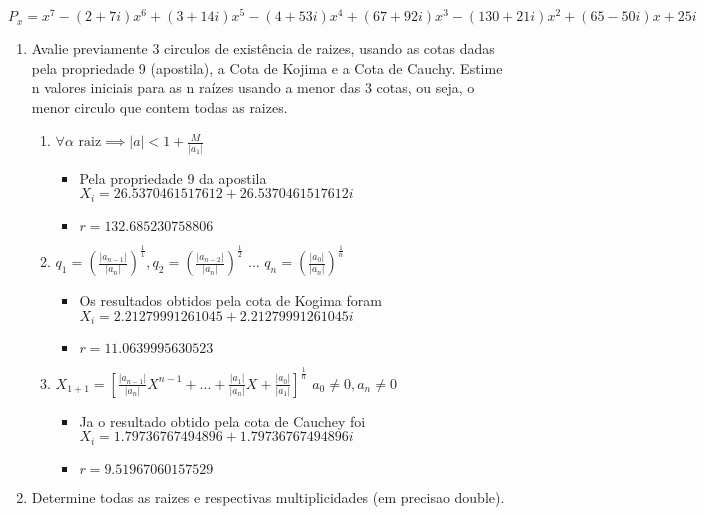 \documentclass[fleqn]{article}
\begin{document}
\item $P_{x} = x^7-(2+7 i) x^6+(3+14 i) x^5-(4+53 i) x^4+(67+92 i) x^3-(130+21 i) x^2+(65-50 i) x+25 i$
\begin{enumerate}
   \item Avalie previamente 3 circulos de existência de raizes, usando as cotas dadas pela propriedade 9 (apostila), a Cota de Kojima e a Cota de Cauchy. Estime n valores iniciais para as n raízes usando a menor das 3 cotas, ou seja, o menor circulo que contem todas as raizes.\\  
      \begin{enumerate}
	 \item $\forall \alpha \textrm{ raiz} \implies |a| < 1 +                      \frac{M}{|a_{1}|} $
	    \begin{itemize}
	    \item Pela propriedade 9 da apostila $X_{i} = 26.5370461517612             + 26.5370461517612i$
	    \item $r = 132.685230758806$\\
	    \end{itemize}
	 \item $q_{1} = ({\frac{|a_{n-1}|}{|a_{n}|}})^\frac{1}{1} ,
	        q_{2} = ({\frac{|a_{n-2}|}{|a_{n}|}})^\frac{1}{2}$ ...  
	        $q_{n} = ({\frac{|a_{0}|}{|a_{n}|}})^\frac{1}{n}$
	    \begin{itemize}
	    \item Os resultados obtidos pela cota de Kogima foram
	        $X_{i} = 2.21279991261045 + 2.21279991261045i$
	        \item $r = 11.0639995630523$\\
	    \end{itemize}
	 \item $X_{1+1} = \left[\frac{|a_{n-1}|}{|a_{n}|}X^{n-1} + ... +
	       \frac{|a_{1}|}{|a_{n}|}X +\frac{|a_{0}|}{|a_{1}|}\right]
	       ^\frac{1}{n}$ $a_{0}\neq 0, a_{n}\neq 0$
	    \begin{itemize}
	    \item Ja o resultado obtido pela cota de Cauchey foi
	          $X_{i} = 1.79736767494896 + 1.79736767494896i$
	    \item $r = 9.51967060157529$\\
	    \end{itemize}
      \end{enumerate}
   \item  Determine todas as raizes e respectivas multiplicidades (em         precisao double).
   \begin{itemize}

\end{itemize}
\end{enumerate}
\end{document}
